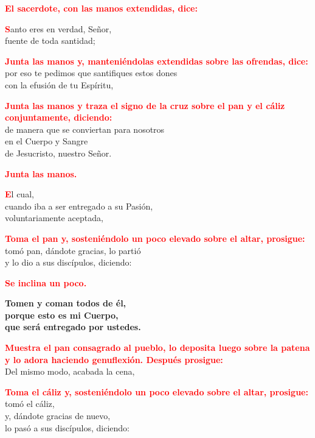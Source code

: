 \documentclass[12pt, letterpaper]{report}
\begin{document}
  \large{\bfseries \textcolor{red}{El sacerdote, con las manos extendidas, dice:}}
  
  \lettrine[lines=2]{\bfseries \textcolor{red}{S}}{}\Large anto eres en verdad, Se\~nor,\\
  fuente de toda santidad;

  \large{\bfseries \textcolor{red}{Junta las manos y, manteni\'endolas extendidas sobre las ofrendas, dice:}}\\
  \Large por eso te pedimos que santifiques estos dones\\
  con la efusi\'on de tu Esp\'iritu,

  \large{\bfseries \textcolor{red}{Junta las manos y traza el signo de la cruz sobre el pan y el c\'aliz conjuntamente, diciendo:}}\\
  \Large de manera que se conviertan para nosotros\\
  en el Cuerpo y \Huge{\textcolor{red}{}} \Large Sangre\\
  de Jesucristo, nuestro Se\~nor.

  \large{\bfseries \textcolor{red}{Junta las manos.}}

  \lettrine[lines=2]{\bfseries \textcolor{red}{E}}{}\Large l cual,\\
  cuando iba a ser entregado a su Pasi\'on,\\
  voluntariamente aceptada,

  \large{\bfseries \textcolor{red}{Toma el pan y, sosteni\'endolo un poco elevado sobre el altar, prosigue:}}\\
  \Large tom\'o pan, d\'andote gracias, lo parti\'o\\
  y lo dio a sus disc\'ipulos, diciendo:

  \large{\bfseries \textcolor{red}{Se inclina un poco.}}

  \LARGE{ \bfseries{ Tomen y coman todos de \'el,\\
  porque esto es mi Cuerpo,\\
  que ser\'a entregado por ustedes.}}

  \large{\bfseries \textcolor{red}{Muestra el pan consagrado al pueblo, lo deposita luego sobre la patena y lo adora haciendo genuflexi\'on. Despu\'es prosigue:}}\\
  \Large Del mismo modo, acabada la cena,

  \large{\bfseries \textcolor{red}{Toma el c\'aliz y, sosteni\'endolo un poco elevado sobre el altar, prosigue:}}\\
  \Large tom\'o el c\'aliz,\\
  y, d\'andote gracias de nuevo,\\
  lo pas\'o a sus disc\'ipulos, diciendo:
\end{document}
